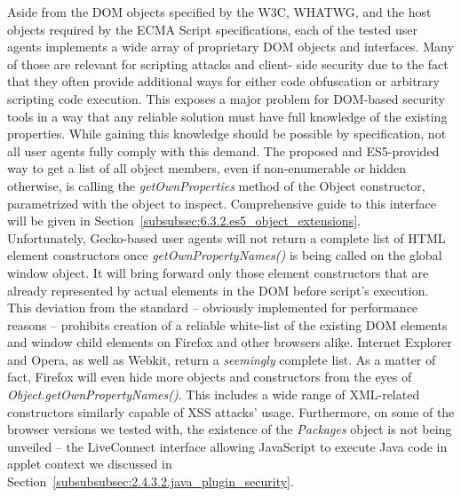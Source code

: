     Aside from the DOM objects specified by the W3C, WHATWG, and the host objects required by the ECMA Script specifications, each of the tested user agents implements a wide array of proprietary DOM objects and interfaces. Many of those are relevant for scripting attacks and client- side security due to the fact that they often provide additional ways for either code obfuscation or arbitrary scripting code execution. This exposes a major problem for DOM-based security tools in a way that any reliable solution must have full knowledge of the existing properties. While gaining this knowledge should be possible by specification, not all user agents fully comply with this demand. The proposed and ES5-provided way to get a list of all object members, even if non-enumerable or hidden otherwise, is calling the \textit{getOwnProperties} method of the Object constructor, parametrized with the object to inspect. Comprehensive guide to this interface will be given in Section~\ref{subsubsec:6.3.2.es5_object_extensions}. \\
  
    Unfortunately, Gecko-based user agents will not return a complete list of HTML element constructors once \textit{getOwnPropertyNames()} is being called on the global window object. It will bring forward only those element constructors that are already represented by actual elements in the DOM before script's execution. This deviation from the standard -- obviously implemented for performance reasons -- prohibits creation of a reliable white-list of the existing DOM elements and window child elements on Firefox and other browsers alike. Internet Explorer and Opera, as well as Webkit, return a \textit{seemingly} complete list. As a matter of fact, Firefox will even hide more objects and constructors from the eyes of \textit{Object.getOwnPropertyNames()}. This includes a wide range of XML-related constructors similarly capable of XSS attacks' usage. Furthermore, on some of the browser versions we tested with, the existence of the \textit{Packages} object is not being unveiled -- the LiveConnect interface allowing JavaScript to execute Java code in applet context we discussed in Section~\ref{subsubsubsec:2.4.3.2.java_plugin_security}.\\

